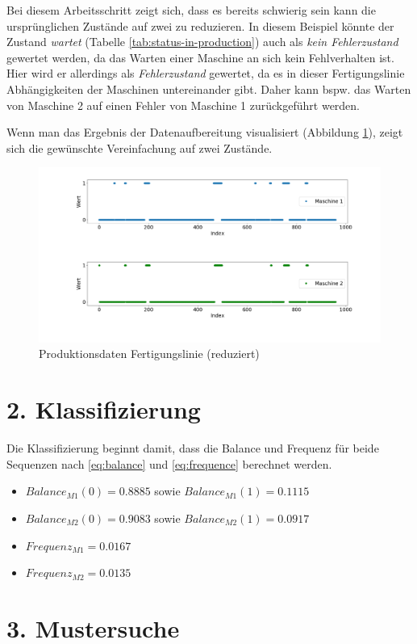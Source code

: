 Bei diesem Arbeitsschritt zeigt sich, dass es bereits schwierig sein kann die ursprünglichen Zustände auf zwei zu reduzieren. In diesem Beispiel könnte der Zustand \textit{wartet} (Tabelle \ref{tab:status-in-production}) auch als \textit{kein Fehlerzustand} gewertet werden, da das Warten einer Maschine an sich kein Fehlverhalten ist. Hier wird er allerdings als \textit{Fehlerzustand} gewertet, da es in dieser Fertigungslinie Abhängigkeiten der Maschinen untereinander gibt. Daher kann bspw. das Warten von Maschine 2 auf einen Fehler von  Maschine 1 zurückgeführt werden.

Wenn man das Ergebnis der Datenaufbereitung visualisiert (Abbildung \ref{fig:reduced-data}), zeigt sich die gewünschte Vereinfachung auf zwei Zustände.

\begin{figure}[H]
	\centering
	\includegraphics[scale=0.32]{images/Vorgehen/reduced_data}
	\caption{Produktionsdaten Fertigungslinie (reduziert)}
	\label{fig:reduced-data}
\end{figure}

\section{2. Klassifizierung}
Die Klassifizierung beginnt damit, dass die Balance und Frequenz für beide Sequenzen nach \ref{eq:balance} und \ref{eq:frequence} berechnet werden.
\begin{itemize}
	\item $Balance_{M1}(0) = 0.8885$ sowie $Balance_{M1}(1) = 0.1115$
	\item $Balance_{M2}(0) = 0.9083$ sowie $Balance_{M2}(1) = 0.0917$
	\item $Frequenz_{M1} = 0.0167$
	\item $Frequenz_{M2} = 0.0135$
\end{itemize}

\section{3. Mustersuche}
